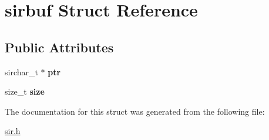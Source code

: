 \hypertarget{structsirbuf}{}\section{sirbuf Struct Reference}
\label{structsirbuf}
\subsection*{Public Attributes}
\begin{DoxyCompactItemize}
\item 
sirchar\+\_\+t $\ast$ {\bfseries ptr}\hypertarget{structsirbuf_ae310afa4abdf67dcd5f49f075e86f75b}{}\label{structsirbuf_ae310afa4abdf67dcd5f49f075e86f75b}

\item 
size\+\_\+t {\bfseries size}\hypertarget{structsirbuf_ac893fa822476bbe7e49ed4d3596ea37b}{}\label{structsirbuf_ac893fa822476bbe7e49ed4d3596ea37b}

\end{DoxyCompactItemize}


The documentation for this struct was generated from the following file\+:\begin{DoxyCompactItemize}
\item 
\hyperlink{sir_8h}{sir.\+h}\end{DoxyCompactItemize}
